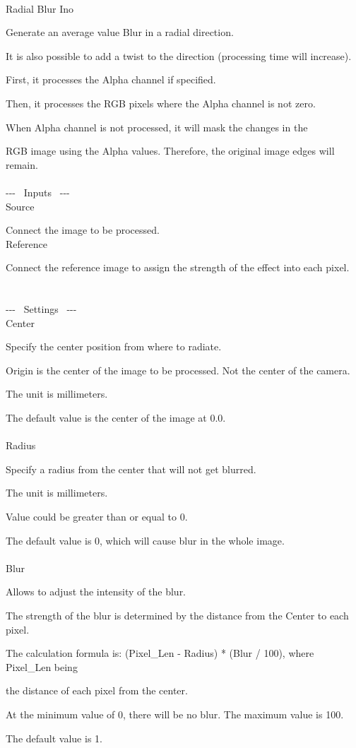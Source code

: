 \documentclass[a4paper,12pt]{article}
\begin{document}
\thispagestyle{empty}

\Large
\noindent \\
Radial Blur Ino\medskip
\par
\normalsize
Generate an average value Blur in a radial direction.\par
It is also possible to add a twist to the direction (processing time will increase).\\
\par
First, it processes the Alpha channel if specified.\par
Then, it processes the RGB pixels where the Alpha channel is not zero.\par
When Alpha channel is not processed, it will mask the changes in the\par
RGB image using the Alpha values. Therefore, the original image edges will remain.\\
\\
-{-}- \ Inputs \ -{-}-\\
Source\par
Connect the image to be processed.\\
Reference\par
Connect the reference image to assign the strength of the effect into each pixel.\\
\\
\\
-{-}- \ Settings \ -{-}-\\
Center\par
Specify the center position from where to radiate.\par
Origin is the center of the image to be processed. Not the center of the camera.\par
The unit is millimeters.\par
The default value is the center of the image at  0.0\textquotedbl .\\
\\
Radius\par
Specify a radius from the center that will not get blurred.\par
The unit is millimeters.\par
Value could be greater than or equal to 0.\par
The default value is 0, which will cause blur in the whole image.\\
\\
Blur\par
Allows to adjust the intensity of the blur.\par
The strength of the blur is determined by the distance from the Center to each pixel.\par
The calculation formula is: (Pixel\_Len - Radius) * (Blur / 100), where Pixel\_Len being\par 
the distance of each pixel from the center.\par
At the minimum value of 0, there will be no blur. The maximum value is 100.\par
The default value is 1.
\end{document}
